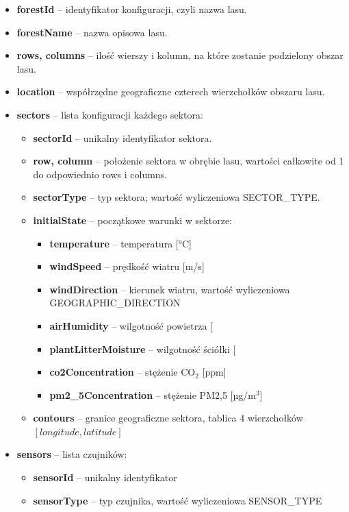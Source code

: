 \documentclass[11pt,a4paper]{article}
\begin{document}
\begin{itemize}
    \item \textbf{forestId} – identyfikator konfiguracji, czyli nazwa lasu.
    \item \textbf{forestName} – nazwa opisowa lasu.
    \item \textbf{rows, columns} – ilość wierszy i kolumn, na które zostanie podzielony obszar lasu.
    \item \textbf{location} – współrzędne geograficzne czterech wierzchołków obszaru lasu.
    \item \textbf{sectors} – lista konfiguracji każdego sektora:
    \begin{itemize}
        \item \textbf{sectorId} – unikalny identyfikator sektora.
        \item \textbf{row, column} – położenie sektora w obrębie lasu, wartości całkowite od 1 do odpowiednio rows i columns.
        \item \textbf{sectorType} – typ sektora; wartość wyliczeniowa SECTOR\_TYPE.
        \item \textbf{initialState} – początkowe warunki w sektorze:
        \begin{itemize}
            \item \textbf{temperature} – temperatura [°C]
            \item \textbf{windSpeed} – prędkość wiatru [m/s]
            \item \textbf{windDirection} – kierunek wiatru, wartość wyliczeniowa GEOGRAPHIC\_DIRECTION
            \item \textbf{airHumidity} – wilgotność powietrza [%
            \item \textbf{plantLitterMoisture} – wilgotność ściółki [%
            \item \textbf{co2Concentration} – stężenie CO\(_2\) [ppm]
            \item \textbf{pm2\_5Concentration} – stężenie PM2,5 [µg/m\(^3\)]
        \end{itemize}
        \item \textbf{contours} – granice geograficzne sektora, tablica 4 wierzchołków \([longitude, latitude]\)
    \end{itemize}
    \item \textbf{sensors} – lista czujników:
    \begin{itemize}
        \item \textbf{sensorId} – unikalny identyfikator
        \item \textbf{sensorType} – typ czujnika, wartość wyliczeniowa SENSOR\_TYPE

\end{itemize}
\end{itemize}
\end{document}
